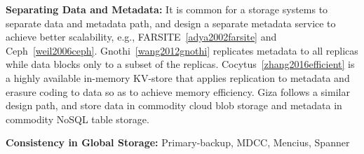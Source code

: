 
{\bf Separating Data and Metadata:}
It is common for a storage systems to separate data and metadata path, and design a separate metadata service to achieve better scalability, e.g., FARSITE~\ref{adya2002farsite} and Ceph~\ref{weil2006ceph}. Gnothi~\ref{wang2012gnothi} replicates metadata to all replicas while data blocks only to a subset of the replicas. Cocytus~\ref{zhang2016efficient} is a highly available in-memory KV-store that applies replication to metadata and erasure coding to data so as to achieve memory efficiency.
Giza follows a similar design path, and store data in commodity cloud blob storage and metadata in commodity NoSQL table storage.

{\bf Consistency in Global Storage:}
Primary-backup, MDCC, Mencius, Spanner

